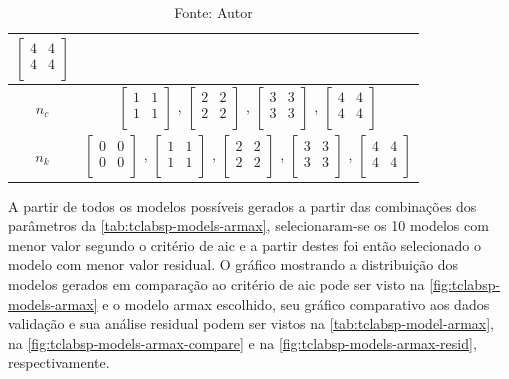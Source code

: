 \begin{table}[h]
\begin{tabular}{c|c}
							$ \begin{bmatrix}	4	&	4	\\	4	&	4	\\	\end{bmatrix} $		\\ \midrule
		$n_c$			&
							$ \begin{bmatrix}	1	&	1	\\	1	&	1	\\	\end{bmatrix} $	,		
							$ \begin{bmatrix}	2	&	2	\\	2	&	2	\\	\end{bmatrix} $	,		
							$ \begin{bmatrix}	3	&	3	\\	3	&	3	\\	\end{bmatrix} $	,		
							$ \begin{bmatrix}	4	&	4	\\	4	&	4	\\	\end{bmatrix} $		\\ \midrule
		$n_k$			&
							$ \begin{bmatrix}	0	&	0	\\	0	&	0	\\	\end{bmatrix} $	,		
							$ \begin{bmatrix}	1	&	1	\\	1	&	1	\\	\end{bmatrix} $	,		
							$ \begin{bmatrix}	2	&	2	\\	2	&	2	\\	\end{bmatrix} $	,		
							$ \begin{bmatrix}	3	&	3	\\	3	&	3	\\	\end{bmatrix} $	,		
							$ \begin{bmatrix}	4	&	4	\\	4	&	4	\\	\end{bmatrix} $		\\ \bottomrule
	\end{tabular}
	\caption*{Fonte: Autor}
\end{table}

A partir de todos os modelos possíveis gerados a partir das combinações dos parâmetros da \cref{tab:tclabsp-models-armax},
selecionaram-se os 10 modelos com menor valor segundo o critério de \acrshort{aic} e a partir destes foi então
selecionado o modelo com menor valor residual.
O gráfico mostrando a distribuição dos modelos gerados em comparação ao critério de \acrshort{aic} pode ser
visto na \cref{fig:tclabsp-models-armax} e o modelo \acrshort{armax} escolhido, seu gráfico comparativo aos dados validação
e sua análise residual podem ser vistos na \cref{tab:tclabsp-model-armax}, na \cref{fig:tclabsp-models-armax-compare} e na
\cref{fig:tclabsp-models-armax-resid}, respectivamente.

